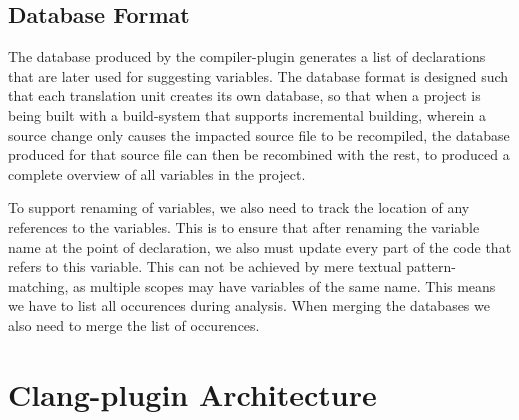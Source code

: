 \subsection{Database Format}
\label{sec:dbfmt}
The database produced by the compiler-plugin generates a list of declarations
that are later used for suggesting variables.
The database format is designed such that each translation unit creates its own
database, so that when a project is being built with a build-system that
supports incremental building, wherein a source change only causes the impacted
source file to be recompiled, the database produced for that source file can
then be recombined with the rest, to produced a complete overview of all
variables in the project.

To support renaming of variables, we also need to track the location of any
references to the variables. This is to ensure that after renaming the
variable name at the point of declaration, we also must update every part of the
code that refers to this variable. This can not be achieved by mere textual
pattern-matching, as multiple scopes may have variables of the same name. This
means we have to list all occurences during analysis. When merging the databases
we also need to merge the list of occurences.

\section{Clang-plugin Architecture}


